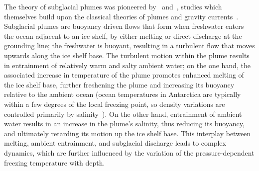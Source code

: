 \documentclass[openacc]{rsproca_new}%
\begin{document}
The theory of subglacial plumes was pioneered by~\citet{MacAyeal1985} and~\citet{Jenkins1991JGeophysResOceans}, studies which themselves build upon the classical theories of plumes and gravity currents~\citep{Ellison1959JFM, Morton1956PRSL, Turner1979}. Subglacial plumes are buoyancy driven flows that form when freshwater enters the ocean adjacent to an ice shelf, by either melting or direct discharge at the grounding line; the freshwater is buoyant, resulting in a turbulent flow that moves upwards along the ice shelf base. The turbulent motion within the plume results in entrainment of relatively warm and salty ambient water; on the one hand, the associated increase in temperature of the plume promotes enhanced melting of the ice shelf base, further freshening the plume and increasing its buoyancy relative to the ambient ocean (ocean temperatures in Antarctica are typically within a few degrees of the local freezing point, so density variations are controlled primarily by salinity~\citep{Hewitt2020AnnRevFlu}). On the other hand, entrainment of ambient water results in an increase in the plume's salinity, thus reducing its buoyancy, and ultimately retarding its motion up the ice shelf base. This interplay between melting, ambient entrainment, and subglacial discharge leads to complex dynamics, which are further influenced by the variation of the pressure-dependent freezing temperature with depth. 
\end{document}
